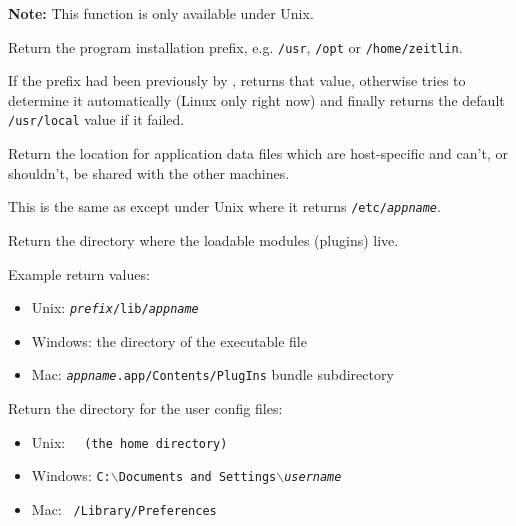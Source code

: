 
\textbf{Note: } This function is only available under Unix.

Return the program installation prefix, e.g. \texttt{/usr}, \texttt{/opt} or 
\texttt{/home/zeitlin}.

If the prefix had been previously by 
, returns that
value, otherwise tries to determine it automatically (Linux only right
now) and finally returns the default \texttt{/usr/local} value if it failed.


\label{wxstandardpathsgetlocaldatadir}


Return the location for application data files which are host-specific and
can't, or shouldn't, be shared with the other machines.

This is the same as  except
under Unix where it returns \texttt{/etc/\textit{appname}}.


\label{wxstandardpathsgetpluginsdir}


Return the directory where the loadable modules (plugins) live.

Example return values:
\begin{itemize}
    \item Unix: \texttt{\textit{prefix}/lib/\textit{appname}}
    \item Windows: the directory of the executable file
    \item Mac: \texttt{\textit{appname}.app/Contents/PlugIns} bundle subdirectory
\end{itemize}




\label{wxstandardpathsgetuserconfigdir}


Return the directory for the user config files:
\begin{itemize}
    \item Unix: \tt{~} (the home directory)
    \item Windows: \tt{C:$\backslash$Documents and Settings$\backslash$\textit{username}}
    \item Mac: \tt{~/Library/Preferences}
\end{itemize}

